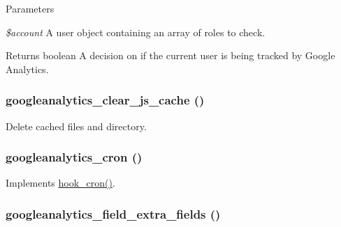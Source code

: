 \begin{DoxyParams}{Parameters}
\item[{\em \$account}]A user object containing an array of roles to check. \end{DoxyParams}
\begin{DoxyReturn}{Returns}
boolean A decision on if the current user is being tracked by Google Analytics. 
\end{DoxyReturn}
\hypertarget{googleanalytics_8module_ade82c3b418d046e498a1e2cc6b075756}{
\subsubsection[{googleanalytics\_\-clear\_\-js\_\-cache}]{\setlength{\rightskip}{0pt plus 5cm}googleanalytics\_\-clear\_\-js\_\-cache ()}}
\label{googleanalytics_8module_ade82c3b418d046e498a1e2cc6b075756}
Delete cached files and directory. \hypertarget{googleanalytics_8module_aa413822743813597fe3944c364d03006}{
\subsubsection[{googleanalytics\_\-cron}]{\setlength{\rightskip}{0pt plus 5cm}googleanalytics\_\-cron ()}}
\label{googleanalytics_8module_aa413822743813597fe3944c364d03006}
Implements \hyperlink{group__hooks_gaf07f1e3d98112fc2ba6920cf7ee6fb16}{hook\_\-cron()}. \hypertarget{googleanalytics_8module_a7280096e9cb3e2b5f020f9f31dbfcfd1}{
\subsubsection[{googleanalytics\_\-field\_\-extra\_\-fields}]{\setlength{\rightskip}{0pt plus 5cm}googleanalytics\_\-field\_\-extra\_\-fields ()}}
\label{googleanalytics_8module_a7280096e9cb3e2b5f020f9f31dbfcfd1}
